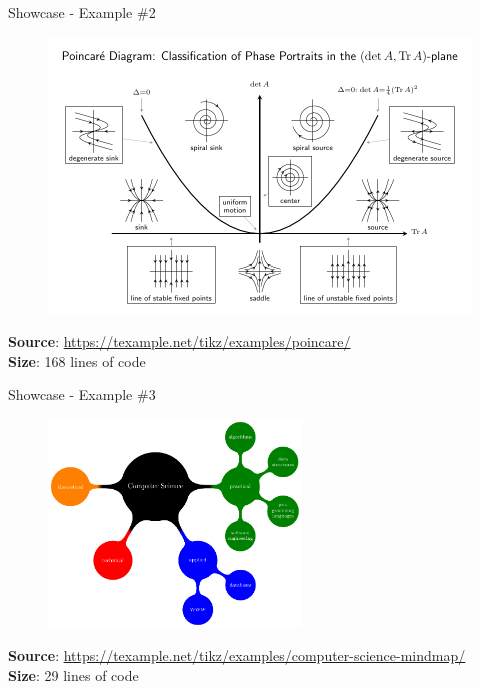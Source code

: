 \begin{frame}{Showcase - Example \#2}
    \begin{figure}
        \centering
        \includegraphics[height=0.7\textheight]{img/examples/poincare.pdf}
    \end{figure}
    \textbf{Source}: {\scriptsize\url{https://texample.net/tikz/examples/poincare/}}
    \\
    \textbf{Size}: 168 lines of code
\end{frame}

\begin{frame}{Showcase - Example \#3}
    \begin{figure}
        \centering
        \includegraphics[width=0.6\textwidth]{img/examples/computer-science-mindmap.pdf}
        \caption*{}
        \label{fig:compscimindmap}
    \end{figure}
    \textbf{Source}: {\scriptsize\url{https://texample.net/tikz/examples/computer-science-mindmap/}}
    \\
    \textbf{Size}: 29 lines of code
\end{frame}

